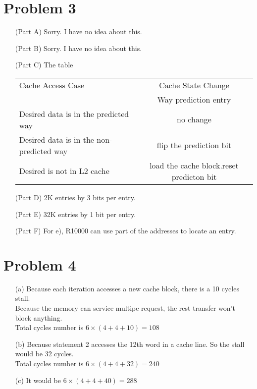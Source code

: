 \documentclass[11pt,leqno]{article}
\begin{document}
\section*{Problem 3}
\begin{enumerate}
\item[(Part A)]
Sorry. I have no idea about this.
\item[(Part B)]
Sorry. I have no idea about this.
\item[(Part C)]
The table

\begin{tabular}{|l|c|}
  \hline
  Cache Access Case & Cache State Change\\
                    & Way prediction entry\\
  \hline
 Desired data is in the predicted way & no change\\
 \hline
 Desired data is in the non-predicted way & flip the prediction bit\\
 \hline
 Desired is not in L2 cache & load the cache block.reset predicton bit\\
  \hline
\end{tabular}

\item[(Part D)]
2K entries by 3 bits per entry.

\item[(Part E)]
32K entries by 1 bit per entry.

\item[(Part F)]
For e), R10000 can use part of the addresses to locate an entry. 

\end{enumerate}

\section*{Problem 4}
\begin{enumerate}
\item[(a)]
Because each iteration accesses a new cache block, there is a 10 cycles stall.\\
Because the memory can service multipe request, the rest transfer won't block anything.\\
Total cycles number is $6 \times (4 + 4 + 10 ) = 108$
\item[(b)]
Because statement 2 accesses the 12th word in a cache line. So the stall would be 32 cycles.\\
Total cycles number is $6 \times (4 + 4 + 32) = 240$

\item[(c)]
It would be $6 \times (4 + 4 + 40) = 288$

\end{enumerate}
\end{document}
